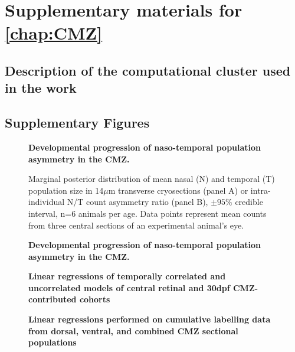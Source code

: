 \chapter{Supplementary materials for \autoref{chap:CMZ}}
\section{Description of the computational cluster used in the work}
\label{cluster}

\section{Supplementary Figures}

\begin{figure}[!h]
    \caption{{\bf Developmental progression of naso-temporal population asymmetry in the CMZ.}}
    \label{morphology}
\end{figure}

\begin{figure}[!h]
    \caption{{\bf Developmental progression of naso-temporal population asymmetry in the CMZ.}}
    Marginal posterior distribution of mean nasal (N) and temporal (T) population size in 14$\mu$m transverse cryosections (panel A) or intra-individual N/T count asymmetry ratio (panel B), $\pm 95\%$ credible interval, n=6 animals per age. Data points represent mean counts from three central sections of an experimental animal's eye. 
    \label{NTontology}
\end{figure}


\begin{figure}[!h]
    \caption{{\bf Linear regressions of temporally correlated and uncorrelated models of central retinal and 30dpf CMZ-contributed cohorts}}
    \label{a27linreg}
\end{figure}


\begin{figure}[!h]
    \caption{{\bf Linear regressions performed on cumulative labelling data from dorsal, ventral, and combined CMZ sectional populations}}
    \label{cumEdUlinreg}
\end{figure}


